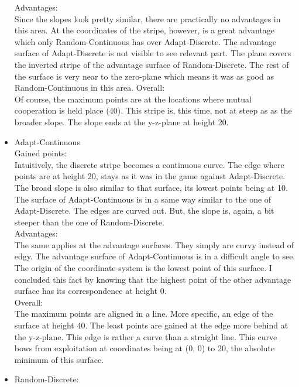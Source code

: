 \documentclass{article}
\begin{document}
\begin{itemize}
		Advantages:\\
			Since the slopes look pretty similar, there are practically no advantages in this area.
			At the coordinates of the stripe, however, is a great advantage which only Random-Continuous has over Adapt-Discrete.
			The advantage surface of Adapt-Discrete is not visible to see relevant part.
			The plane covers the inverted stripe of the advantage surface of Random-Discrete.
			The rest of the surface is very near to the zero-plane which means it was as good as Random-Continuous in this area.
		Overall:\\
			Of course, the maximum points are at the locations where mutual cooperation is held place (40).
			This stripe is, this time, not at steep as as the broader slope.
			The slope ends at the y-z-plane at height 20.\\

	\item Adapt-Continuous\\

		Gained points:\\
			Intuitively, the discrete stripe becomes a continuous curve.
			The edge where points are at height 20, stays as it was in the game against Adapt-Discrete.
			The broad slope is also similar to that surface, its lowest points being at 10.
			The surface of Adapt-Continuous is in a same way similar to the one of Adapt-Discrete.
			The edges are curved out.
			But, the slope is, again, a bit steeper than the one of Random-Discrete.\\
		Advantages:\\
			The same applies at the advantage surfaces.
			They simply are curvy instead of edgy.
			The advantage surface of Adapt-Continuous is in a difficult angle to see.
			The origin of the coordinate-system is the lowest point of this surface.
			I concluded this fact by knowing that the highest point of the other advantage surface has its correspondence at height 0.\\
		Overall:\\
			The maximum points are aligned in a line.
			More specific, an edge of the surface at height 40.
			The least points are gained at the edge more behind at the y-z-plane.
			This edge is rather a curve than a straight line.
			This curve bows from exploitation at coordinates being at (0, 0) to 20, the absolute minimum of this surface.
	
	\item Random-Discrete:\\


\end{itemize}
\end{document}
